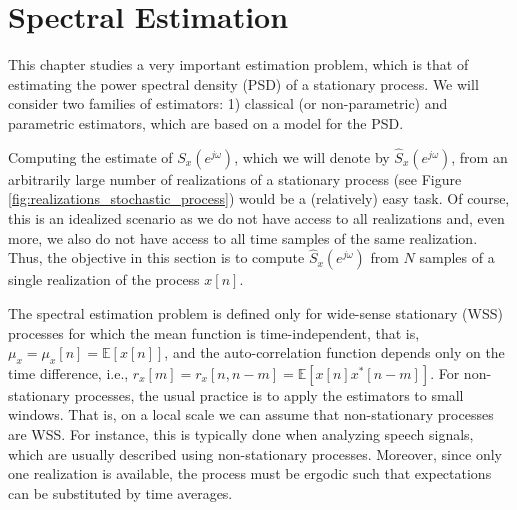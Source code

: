 \chapter{Spectral Estimation}

This chapter studies a very important estimation problem, which is that of estimating the power spectral density (PSD) of a stationary process. We will consider two families of estimators: 1) classical (or non-parametric) and parametric estimators, which are based on a model for the PSD.

Computing the estimate of $S_x(e^{j \omega})$, which we will denote by $\hat{S}_x(e^{j \omega})$, from an arbitrarily large number of realizations of a stationary process (see Figure \ref{fig:realizations_stochastic_process}) would be a (relatively) easy task. Of course, this is an idealized scenario as we do not have access to all realizations and, even more, we also do not have access to all time samples of the same realization. Thus, the objective in this section is to compute $\hat{S}_x(e^{j \omega})$ from $N$ samples of a single realization of the process $x[n]$.

The spectral estimation problem is defined only for wide-sense stationary (WSS) processes for which the mean function is time-independent, that is, $\mu_x = \mu_x[n] = \mathbb{E}[x[n]]$, and the auto-correlation function depends only on the time difference, i.e., $r_{x}[m] = r_{x}[n,n-m] = \mathbb{E}[x[n] x^{\ast}[n-m]]$. For non-stationary processes, the usual practice is to apply the estimators to small windows. That is, on a local scale we can assume that non-stationary processes are WSS. For instance, this is typically done when analyzing speech signals, which are usually described using non-stationary processes. Moreover, since only one realization is available, the process must be ergodic such that expectations can be substituted by time averages.

